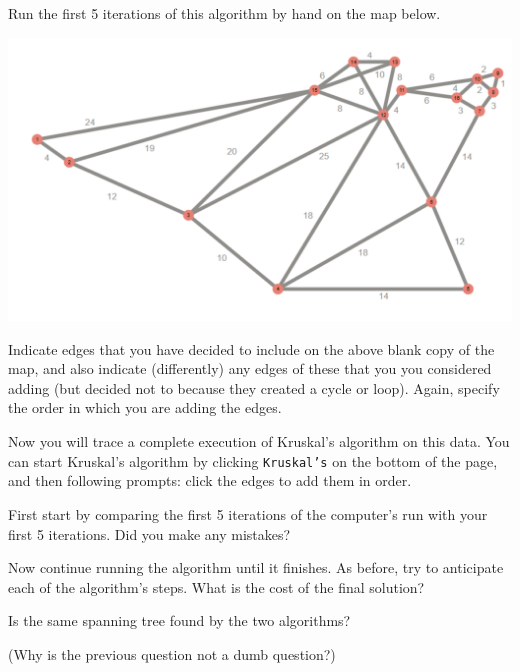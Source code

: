 \documentclass[fullpage,fleqn,leqno]{article}
\begin{document}
Run the first 5 iterations of this algorithm by hand on the map below.
\vspace*{3\baselineskip}

\begin{center}
  \includegraphics[width=.9\textwidth]{EmptyMST.pdf}
\end{center}

\vspace*{3\baselineskip}

Indicate edges that you have decided to include on the above blank
copy of the map, and also indicate (differently) any edges of these
that you you considered adding (but decided not to because they created a cycle or loop). Again, specify the order in
which you are adding the edges.

\vspace*{\baselineskip}


\newpage

Now you will trace a complete execution of Kruskal's algorithm on this
data. You can start Kruskal's algorithm by clicking \texttt{Kruskal's} on the bottom of the page, and then following prompts: click the edges to add them in order.

First start by comparing the first 5 iterations of the
computer's run with your first 5 iterations. Did you make any mistakes?



\vspace*{6\baselineskip}

Now continue running the algorithm until it finishes. As before, try to anticipate each of the algorithm's
steps. What is the cost of the final solution? 

\vspace*{5\baselineskip}
Is the same spanning
tree found by the two algorithms? 

\vspace*{6\baselineskip}
(Why is the previous question not a
dumb question?)
\end{document}
